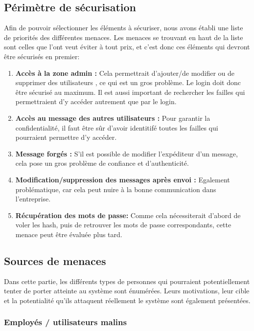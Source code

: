 \documentclass{article}
\begin{document}
\subsection{Périmètre de sécurisation}

Afin de pouvoir sélectionner les éléments à sécuriser, nous avons établi
une liste de priorités des différentes menaces. Les menaces se trouvant
en haut de la liste sont celles que l'ont veut éviter à tout prix, et
c'est donc ces éléments qui devront être sécurisés en premier:

\begin{enumerate}
\def\labelenumi{\arabic{enumi}.}

\item
  \textbf{Accès à la zone admin :} Cela permettrait d'ajouter/de
  modifier ou de supprimer des utilisateurs , ce qui est un gros
  problème. Le login doit donc être sécurisé au maximum. Il est aussi
  important de rechercher les failles qui permettraient d'y accéder
  autrement que par le login.
\item
  \textbf{Accès au message des autres utilisateurs :} Pour garantir la
  confidentialité, il faut être sûr d'avoir identitifé toutes les
  failles qui pourraient permettre d'y accéder.
\item
  \textbf{Message forgés :} S'il est possible de modifier l'expéditeur
  d'un message, cela pose un gros problème de confiance et
  d'authenticité.
\item
  \textbf{Modification/suppression des messages après envoi :} Egalement
  problématique, car cela peut nuire à la bonne communication dans
  l'entreprise.
\item
  \textbf{Récupération des mots de passe:} Comme cela nécessiterait
  d'abord de voler les hash, puis de retrouver les mots de passe
  correspondants, cette menace peut être évaluée plus tard.
\end{enumerate}

\subsection{Sources de menaces}

Dans cette partie, les différents types de personnes qui pourraient
potentiellement tenter de porter atteinte au système sont énumérées.
Leurs motivations, leur cible et la potentialité qu'ils attaquent
réellement le système sont également présentées.

\subsubsection{Employés / utilisateurs malins}
\end{document}
